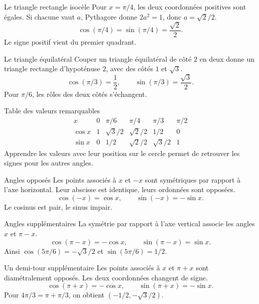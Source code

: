 \documentclass[aspectratio=169,12pt]{beamer}
\begin{document}
\renewcommand{\slidekind}{COMPRENDRE}
\begin{frame}[t,fragile]{Le triangle rectangle isocèle}
Pour $x=\pi/4$, les deux coordonnées positives sont égales. Si chacune vaut $a$, Pythagore donne $2a^2=1$, donc $a=\sqrt2/2$.\[\cos(\pi/4)=\sin(\pi/4)=\frac{\sqrt2}{2}.\] Le signe positif vient du premier quadrant.
\end{frame}
\renewcommand{\slidekind}{COMPRENDRE}
\begin{frame}[t,fragile]{Le triangle équilatéral}
Couper un triangle équilatéral de côté $2$ en deux donne un triangle rectangle d’hypoténuse $2$, avec des côtés $1$ et $\sqrt3$.\[\cos(\pi/3)=\frac12,\qquad\sin(\pi/3)=\frac{\sqrt3}{2}.\] Pour $\pi/6$, les rôles des deux côtés s’échangent.
\end{frame}
\renewcommand{\slidekind}{COMPRENDRE}
\begin{frame}[t,fragile]{Table des valeurs remarquables}
\[\begin{array}{c|ccccc}x&0&\pi/6&\pi/4&\pi/3&\pi/2\\\hline\cos x&1&\sqrt3/2&\sqrt2/2&1/2&0\\\sin x&0&1/2&\sqrt2/2&\sqrt3/2&1\end{array}\]\medskip Apprendre les valeurs avec leur position sur le cercle permet de retrouver les signes pour les autres angles.
\end{frame}
\renewcommand{\slidekind}{COMPRENDRE}
\begin{frame}[t,fragile]{Angles opposés}
Les points associés à $x$ et $-x$ sont symétriques par rapport à l’axe horizontal. Leur abscisse est identique, leurs ordonnées sont opposées.\[\cos(-x)=\cos x,\qquad\sin(-x)=-\sin x.\] Le cosinus est pair, le sinus impair.
\end{frame}
\renewcommand{\slidekind}{COMPRENDRE}
\begin{frame}[t,fragile]{Angles supplémentaires}
La symétrie par rapport à l’axe vertical associe les angles $x$ et $\pi-x$.\[\cos(\pi-x)=-\cos x,\qquad\sin(\pi-x)=\sin x.\] Ainsi $\cos(5\pi/6)=-\sqrt3/2$ et $\sin(5\pi/6)=1/2$.
\end{frame}
\renewcommand{\slidekind}{COMPRENDRE}
\begin{frame}[t,fragile]{Un demi-tour supplémentaire}
Les points associés à $x$ et $\pi+x$ sont diamétralement opposés. Les deux coordonnées changent de signe.\[\cos(\pi+x)=-\cos x,\qquad\sin(\pi+x)=-\sin x.\] Pour $4\pi/3=\pi+\pi/3$, on obtient $(-1/2,-\sqrt3/2)$.
\end{frame}
\renewcommand{\slidekind}{COMPRENDRE}
\end{document}
